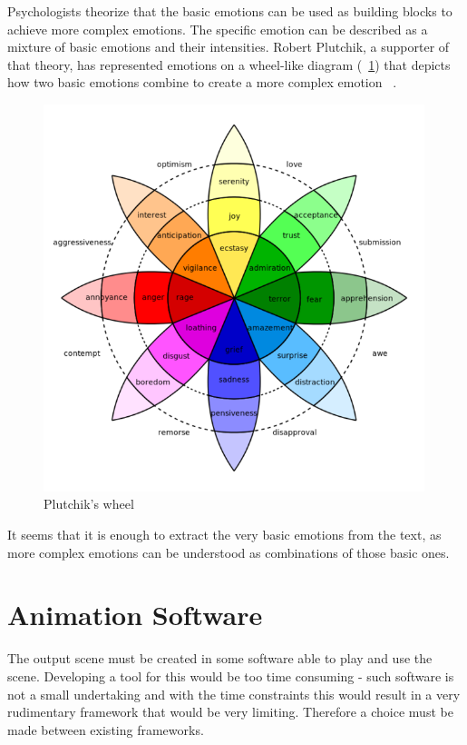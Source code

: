 Psychologists theorize that the basic emotions can be used as building blocks to achieve more complex emotions. The specific emotion can be described as a mixture of basic emotions and their intensities. Robert Plutchik, a supporter of that theory, has represented emotions on a wheel-like diagram (~\ref{fig:wheel}) that depicts how two basic emotions combine to create a more complex emotion ~\cite{basicemo}.

\begin{figure}[!ht]
\centerline{\includegraphics[width = 30em]{img/wheel.png}}
\caption{Plutchik's wheel}\label{fig:wheel}
\end{figure}

It seems that it is enough to extract the very basic emotions from the text, as more complex emotions can be understood as combinations of those basic ones.


\section{Animation Software}

The output scene must be created in some software able to play and use the scene. Developing a tool for this would be too time consuming - such software is not a small undertaking and with the time constraints this would result in a very rudimentary framework that would be very limiting. Therefore a choice must be made between existing frameworks.


